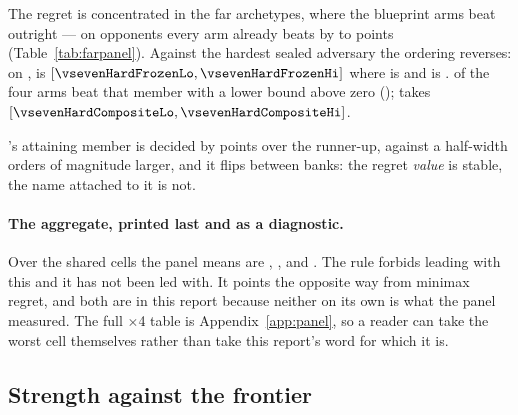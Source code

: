 The regret is concentrated in the far archetypes, where the blueprint arms beat \frozen{} outright ---
on opponents every arm already beats by \vsevenFarSpanLo{} to \vsevenFarSpanHi{} points
(Table~\ref{tab:farpanel}). Against
the hardest sealed adversary the ordering reverses: on \vsevenHardSealed{}, \frozen{} is
\vsevenHardFrozen{} $[\vsevenHardFrozenLo, \vsevenHardFrozenHi]$ where \incumbent{} is
\vsevenHardIncumbent{} and \fcheap{} is \vsevenHardFcheap{}. \vsevenHardBeaters{} of the four arms beat that member with a lower bound above zero
(\vsevenHardBeaterNames{}); \composite{} takes \vsevenHardComposite{}
$[\vsevenHardCompositeLo, \vsevenHardCompositeHi]$.

\begin{table}[t]\centering
\caption{The far archetypes, where the regret difference lives. Every arm beats every one of these by between
\vsevenFarSpanLo{} and \vsevenFarSpanHi{} points; the differences between arms are what minimax regret is measuring.}
\label{tab:farpanel}
{\small}
\end{table}

\incumbent{}'s attaining member is decided by \vsevenRegretIncumbentGap{} points over the
runner-up, against a half-width orders of magnitude larger, and it flips between banks: the regret \emph{value} is
stable, the name attached to it is not.

\paragraph{The aggregate, printed last and as a diagnostic.}
Over the \vsevenPanelMembers{} shared cells the panel means are \frozen{} \vsevenPanelMeanFrozen{},
\composite{} \vsevenPanelMeanComposite{}, \fcheap{} \vsevenPanelMeanFcheap{} and \incumbent{}
\vsevenPanelMeanIncumbent{}. The rule forbids leading with this and it has not been led with. It
points the opposite way from minimax regret, and both are in this report because neither on its own
is what the panel measured. The full \vsevenPanelMembers{}$\times$4 table is
Appendix~\ref{app:panel}, so a reader can take the worst cell themselves rather than take this
report's word for which it is.

\subsection{Strength against the frontier}
\label{sec:results-frontier}

\begin{table}[t]\centering
\caption{Headline strength against the \vsix{} frontier, paired duplicate, both primary banks. The
preregistered primary claim is the \fcheap{} row.}
\label{tab:frontier}
{\small}
\end{table}

